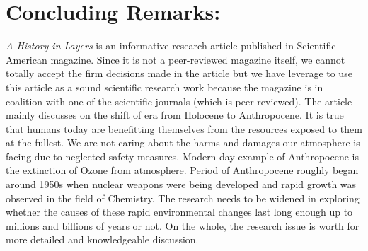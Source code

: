 \documentclass{article}
\begin{document}
\section*{Concluding Remarks:}
\textit{A History in Layers} is an informative research article published in Scientific American magazine. Since it is not a peer-reviewed magazine itself, we cannot totally accept the firm decisions made in the article but we have leverage to use this article as a sound scientific research work because the magazine is in coalition with one of the scientific journals (which is peer-reviewed). The article mainly discusses on the shift of era from Holocene to Anthropocene. It is true that humans today are benefitting themselves from the resources exposed to them at the fullest. We are not caring about the harms and damages our atmosphere is facing due to neglected safety measures. Modern day example of Anthropocene is the extinction of Ozone from atmosphere. Period of Anthropocene roughly began around 1950s when nuclear weapons were being developed and rapid growth was observed in the field of Chemistry. The research needs to be widened in exploring whether the causes of these rapid environmental changes last long enough up to millions and billions of years or not. On the whole, the research issue is worth for more detailed and knowledgeable discussion. 


\end{document}
